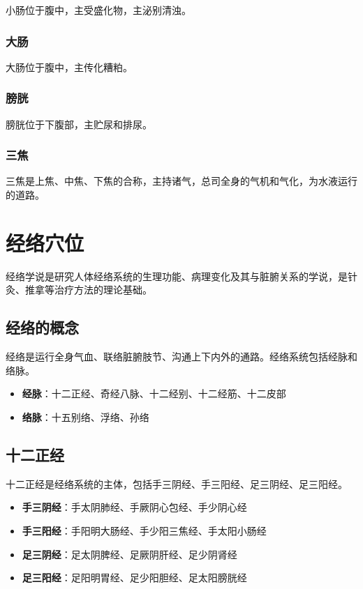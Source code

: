 \documentclass[12pt,UTF8]{ctexbook}
\begin{document}
小肠位于腹中，主受盛化物，主泌别清浊。

\subsubsection{大肠}

大肠位于腹中，主传化糟粕。

\subsubsection{膀胱}

膀胱位于下腹部，主贮尿和排尿。

\subsubsection{三焦}

三焦是上焦、中焦、下焦的合称，主持诸气，总司全身的气机和气化，为水液运行的道路。

\section{经络穴位}

经络学说是研究人体经络系统的生理功能、病理变化及其与脏腑关系的学说，是针灸、推拿等治疗方法的理论基础。

\subsection{经络的概念}

经络是运行全身气血、联络脏腑肢节、沟通上下内外的通路。经络系统包括经脉和络脉。

\begin{itemize}
\item \textbf{经脉}：十二正经、奇经八脉、十二经别、十二经筋、十二皮部
\item \textbf{络脉}：十五别络、浮络、孙络
\end{itemize}

\subsection{十二正经}

十二正经是经络系统的主体，包括手三阴经、手三阳经、足三阴经、足三阳经。

\begin{itemize}
\item \textbf{手三阴经}：手太阴肺经、手厥阴心包经、手少阴心经
\item \textbf{手三阳经}：手阳明大肠经、手少阳三焦经、手太阳小肠经
\item \textbf{足三阴经}：足太阴脾经、足厥阴肝经、足少阴肾经
\item \textbf{足三阳经}：足阳明胃经、足少阳胆经、足太阳膀胱经
\end{itemize}
\end{document}
